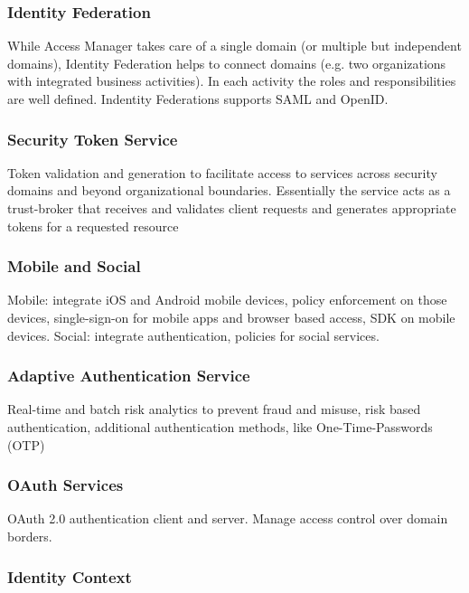 \subsubsection{Identity Federation}

While Access Manager takes care of a single domain (or multiple but independent domains), Identity Federation helps to connect domains (e.g. two organizations with integrated business activities). In each activity the roles and responsibilities are well defined. Indentity Federations supports SAML and OpenID.

\subsubsection{Security Token Service}

Token validation and generation to facilitate access to services across security domains and beyond organizational boundaries. Essentially the service acts as a trust-broker that receives and validates client requests and generates appropriate tokens for a requested resource

\subsubsection{Mobile and Social}

Mobile: integrate iOS and Android mobile devices, policy enforcement on those devices, single-sign-on for mobile apps and browser based access, SDK on mobile devices. Social: integrate authentication, policies for social services.


\subsubsection{Adaptive Authentication Service}

Real-time and batch risk analytics to prevent fraud and misuse, risk based authentication, additional authentication methods, like One-Time-Passwords (OTP)


\subsubsection{OAuth Services}

OAuth 2.0 authentication client and server. Manage access control over domain borders.


\subsubsection{Identity Context}

